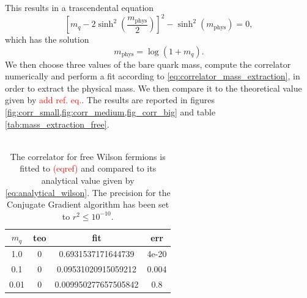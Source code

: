 This results in a trascendental equation 
\begin{equation*}
    \left[m_q - 2 \sinh^2\left(\frac{m_\text{phys}}{2}\right)\right]^2 - \sinh^2\left(m_\text{phys}\right) = 0,
\end{equation*}
which has the solution 
\begin{equation}
    m_\text{phys} = \log\left(1+m_q\right).
    \label{eq:analytical_wilson}
\end{equation}
We then choose three values of the bare quark mass, compute the correlator numerically and perform a fit according to \eqref{eq:correlator_mass_extraction}, in order to extract the physical mass. We then compare it to the theoretical value given by \textcolor{red}{add ref. eq.}. The results are reported in figures \ref{fig:corr_small,fig:corr_medium,fig_corr_big} and table \ref{tab:mass_extraction_free}. \\~\\
\begin{table}
    \centering
    \begin{tabular}[pos]{cccc}
        \toprule 
        $m_q$ & teo & fit & err \\
        \midrule 
        1.0 & 0 & 0.6931537171644739 & 4e-20 \\
        0.1 & 0 & 0.09531020915059212 & 0.004 \\
        0.01 & 0 & 0.009950277657505842 & 0.8 \\
        \bottomrule
    \end{tabular}
    \caption[Fit of the correlator for free Wilson fermions.]{The correlator for free Wilson fermions is fitted to \textcolor{red}{(eqref)} and compared to its analytical value given by \eqref{eq:analytical_wilson}. The precision for the Conjugate Gradient algorithm has been set to $r^2 \leq 10^{-10}$.}
    \label{tab:free_wilson_fit}
\end{table}
